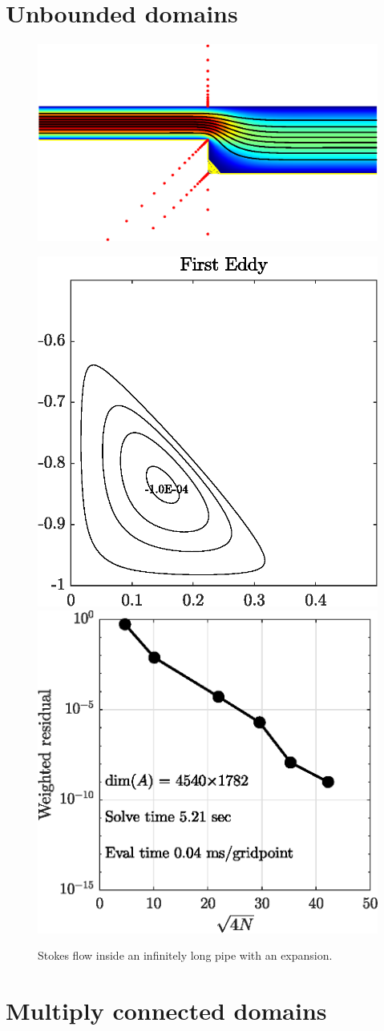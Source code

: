 \section{Unbounded domains \label{sec:unbounded}}


\begin{figure}[H]
	\centering
	\includegraphics[width=\linewidth]{Figures/chan}
	
	\vspace{2em}
	\includegraphics[width=0.45\linewidth]{Figures/chan_eddy}
	\hfill
	\includegraphics[width=0.45\linewidth]{Figures/chan_conv}

	\caption{Stokes flow inside an infinitely long pipe with an expansion.}
	\label{fig:chan}
\end{figure} 

\section{Multiply connected domains \label{sec:multiply}}


